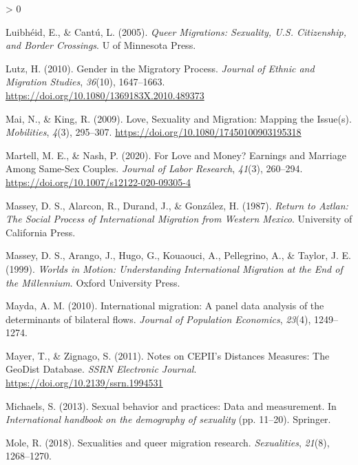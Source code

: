 \documentclass[
  11pt,
]{article}
\newlength{\cslhangindent}
\newenvironment{CSLReferences}[2] %
 {%
  \setlength{\parindent}{0pt}
  \ifodd #1 \everypar{\setlength{\hangindent}{\cslhangindent}}\ignorespaces\fi
  \ifnum #2 > 0
  \setlength{\parskip}{#2\baselineskip}
  \fi
 }%
 {}
\begin{document}
\begin{CSLReferences}{1}{0}
\leavevmode\hypertarget{ref-luibheid_2005}{}%
Luibhéid, E., \& Cantú, L. (2005). \emph{Queer {Migrations}: {Sexuality}, {U}.{S}. {Citizenship}, and {Border Crossings}}. {U of Minnesota Press}.

\leavevmode\hypertarget{ref-lutz_2010}{}%
Lutz, H. (2010). Gender in the {Migratory Process}. \emph{Journal of Ethnic and Migration Studies}, \emph{36}(10), 1647--1663. \url{https://doi.org/10.1080/1369183X.2010.489373}

\leavevmode\hypertarget{ref-mai_2009}{}%
Mai, N., \& King, R. (2009). Love, {Sexuality} and {Migration}: {Mapping} the {Issue}(s). \emph{Mobilities}, \emph{4}(3), 295--307. \url{https://doi.org/10.1080/17450100903195318}

\leavevmode\hypertarget{ref-martell_2020}{}%
Martell, M. E., \& Nash, P. (2020). For {Love} and {Money}? {Earnings} and {Marriage Among Same}-{Sex Couples}. \emph{Journal of Labor Research}, \emph{41}(3), 260--294. \url{https://doi.org/10.1007/s12122-020-09305-4}

\leavevmode\hypertarget{ref-massey_1987}{}%
Massey, D. S., Alarcon, R., Durand, J., \& González, H. (1987). \emph{Return to {Aztlan}: {The Social Process} of {International Migration} from {Western Mexico}}. {University of California Press}.

\leavevmode\hypertarget{ref-massey_1999}{}%
Massey, D. S., Arango, J., Hugo, G., Kouaouci, A., Pellegrino, A., \& Taylor, J. E. (1999). \emph{Worlds in {Motion}: {Understanding International Migration} at the {End} of the {Millennium}}. {Oxford University Press}.

\leavevmode\hypertarget{ref-mayda_2010}{}%
Mayda, A. M. (2010). International migration: A panel data analysis of the determinants of bilateral flows. \emph{Journal of Population Economics}, \emph{23}(4), 1249--1274.

\leavevmode\hypertarget{ref-mayer_2011}{}%
Mayer, T., \& Zignago, S. (2011). Notes on {CEPII}'s {Distances Measures}: {The GeoDist Database}. \emph{SSRN Electronic Journal}. \url{https://doi.org/10.2139/ssrn.1994531}

\leavevmode\hypertarget{ref-michaels_2013}{}%
Michaels, S. (2013). Sexual behavior and practices: {Data} and measurement. In \emph{International handbook on the demography of sexuality} (pp. 11--20). {Springer}.

\leavevmode\hypertarget{ref-mole_2018a}{}%
Mole, R. (2018). Sexualities and queer migration research. \emph{Sexualities}, \emph{21}(8), 1268--1270.


\end{CSLReferences}
\end{document}
